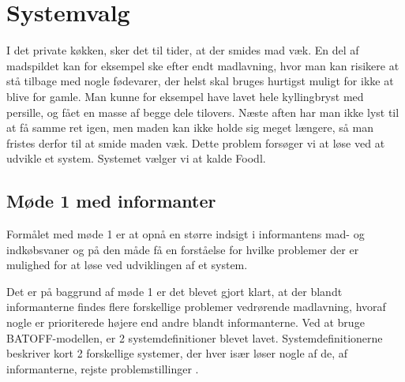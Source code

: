 \section{Systemvalg}
I det private køkken, sker det til tider, at der smides mad væk. En del af madspildet kan for eksempel ske efter endt madlavning, hvor man kan risikere at stå tilbage med nogle fødevarer, der helst skal bruges hurtigst muligt for ikke at blive for gamle. Man kunne for eksempel have lavet hele kyllingbryst med persille, og fået en masse af begge dele tilovers. Næste aften har man ikke lyst til at få samme ret igen, men maden kan ikke holde sig meget længere, så man fristes derfor til at smide maden væk. Dette problem forsøger vi at løse ved at udvikle et system. Systemet vælger vi at kalde Foodl.

\subsection{Møde 1 med informanter}
Formålet med møde 1 er at opnå en større indsigt i informantens mad- og indkøbsvaner og på den måde få en forståelse for hvilke problemer der er mulighed for at løse ved udviklingen af et system.

Det er på baggrund af møde 1 er det blevet gjort klart, at der blandt informanterne findes flere forskellige problemer vedrørende madlavning, hvoraf nogle er prioriterede højere end andre blandt informanterne. Ved at bruge BATOFF-modellen, er 2 systemdefinitioner blevet lavet. Systemdefinitionerne beskriver kort 2 forskellige systemer, der hver især løser nogle af de, af informanterne, rejste problemstillinger .
